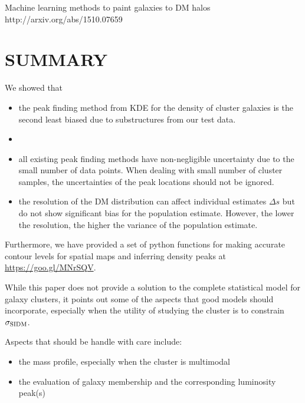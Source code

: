 Machine learning methods to paint galaxies to DM halos 
http://arxiv.org/abs/1510.07659


\section{SUMMARY}
We showed that 
\begin{itemize}
		\item  the peak finding method from KDE for the density of cluster
			galaxies is the second least biased due to substructures from our test data. 
		\item  
		\item  all existing peak finding methods have non-negligible uncertainty 
			due to the small number of data points. When dealing with small number of
			cluster samples, the uncertainties of the peak locations should not be
			ignored.
		\item the resolution of the DM distribution can affect
			individual estimates $\Delta s$ but do not show significant bias for
			the population estimate. However, the lower the resolution, the higher
			the variance of the population estimate.  
\end{itemize}

Furthermore, we have provided a set of python functions for making accurate 
contour levels for spatial maps and inferring density peaks at 
\href{https://goo.gl/MNrSQV}{https://goo.gl/MNrSQV}.



While this paper does not provide a solution to the complete statistical model
for galaxy clusters, it points out some of the aspects that good models should
incorporate, especially when the utility of studying the cluster is to
constrain $\sigma_{\rm SIDM}$.

Aspects that should be handle with care include:
\begin{itemize}
		\item the mass profile, especially when the cluster is multimodal 
		\item the evaluation of galaxy membership and the corresponding luminosity
			peak(s)
	\end{itemize}



